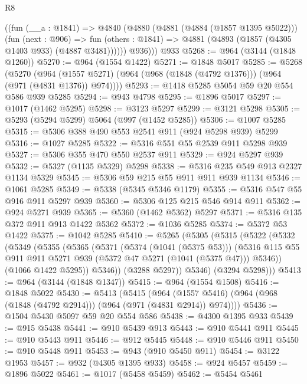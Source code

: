 \begin{lexlean}{R8}
\begin{coremodule}
        ((fun (__a : @1841) =>
        @4840
          (@4880
            (@4881 (@4884 (@1857 @1395 @5022)))
            (fun (next : @906) =>
            fun (others : @1841) => @4881 (@4893 (@1857 (@4305 @1403 @933) (@4887 @3481))))))
          @936)))
    @933
@5268 := @964 (@3144 (@1848 @1260))
@5270 := @964 (@1554 @1422)
@5271 := @1848 @5017
@5285 := @5268
    (@5270
      (@964 (@1557 @5271) (@964 (@968 (@1848 (@4792 @1376))) (@964 (@971 (@4831 @1376)) @974))))
@5293 := @1418 @5285 @5054 @59 @20 @554 @586 @939 @5285
@5294 := @943 @4798
@5295 := @1896 @5017
@5297 := @1017 (@1462 @5295)
@5298 := @3123 @5297
@5299 := @3121 @5298
@5305 := @5293 (@5294 @5299) @5064 (@997 (@1452 @5285))
@5306 := @1007 @5285
@5315 := @5306 @388 @490 @553 @2541 @911 (@924 @5298 @939) @5299
@5316 := @1027 @5285
@5322 := @5316 @551 @55 @2539 @911 @5298 @939
@5327 := @5306 @355 @470 @550 @2537 @911
@5329 := @924 @5297 @939
@5332 := @5327 (@1135 @5329) @5298
@5338 := @5316 @235 @549 @913 @2327 @1134 @5329
@5345 := @5306 @59 @215 @55 @911 @911 @939 @1134
@5346 := @1061 @5285
@5349 := @5338 (@5345 @5346 @1179)
@5355 := @5316 @547 @55 @916 @911 @5297 @939
@5360 := @5306 @125 @215 @546 @914 @911
@5362 := @924 @5271 @939
@5365 := @5360 (@1462 @5362) @5297
@5371 := @5316 @135 @372 @911 @913 @1422 @5362
@5372 := @1036 @5285
@5374 := @5372 @53 @1422
@5375 := @1042 @5285
@5410 := @5265
    (@5305
      (@5315
        (@5322
          (@5332
            (@5349
              (@5355
                (@5365
                  (@5371
                    (@5374 (@1041 (@5375 @53)))
                    (@5316
                      @115
                      @55
                      @911
                      @911
                      @5271
                      @939
                      (@5372 @47 @5271 (@1041 (@5375 @47)))
                      @5346))
                  (@1066 @1422 @5295))
                @5346))
            (@3288 @5297))
          @5346)
        (@3294 @5298)))
@5413 := @964 (@3144 (@1848 @1347))
@5415 := @964 (@1554 @1508)
@5416 := @1848 @5022
@5430 := @5413
    (@5415
      (@964 (@1557 @5416) (@964 (@968 (@1848 (@4792 @2914))) (@964 (@971 (@4831 @2914)) @974))))
@5436 := @1504 @5430 @5097 @59 @20 @554 @586
@5438 := @4300 @1395 @933
@5439 := @915 @5438
@5441 := @910 @5439 @913
@5443 := @910 @5441 @911
@5445 := @910 @5443 @911
@5446 := @912 @5445
@5448 := @910 @5446 @911
@5450 := @910 @5448 @911
@5453 := @943 (@910 @5450 @911)
@5454 := @3122 @1953
@5457 := @932 (@4305 @1395 @933)
@5458 := @924 @5457
@5459 := @1896 @5022
@5461 := @1017 (@5458 @5459)
@5462 := @5454 @5461

\end{coremodule}
\end{lexlean}
